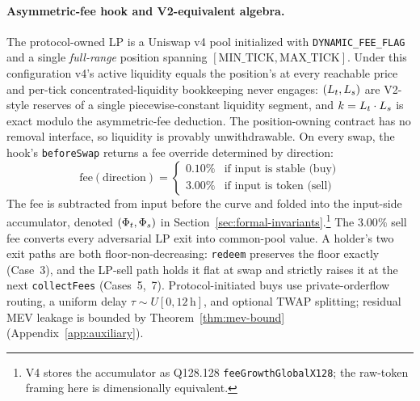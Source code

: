 \paragraph{Asymmetric-fee hook and V2-equivalent algebra.} The protocol-owned LP is a Uniswap v4 pool initialized with \texttt{DYNAMIC\_FEE\_FLAG} and a single \emph{full-range} position spanning $[\text{MIN\_TICK}, \text{MAX\_TICK}]$. Under this configuration v4's active liquidity equals the position's at every reachable price and per-tick concentrated-liquidity bookkeeping never engages: $(L_t, L_s)$ are V2-style reserves of a single piecewise-constant liquidity segment, and $k = L_t \cdot L_s$ is exact modulo the asymmetric-fee deduction. The position-owning contract has no removal interface, so liquidity is provably unwithdrawable. On every swap, the hook's \texttt{beforeSwap} returns a fee override determined by direction:
\begin{equation}
\text{fee}(\text{direction}) =
\begin{cases}
0.10\% & \text{if input is stable (buy)} \\
3.00\% & \text{if input is token (sell)}
\end{cases}
\label{eq:fee-asymmetry}
\end{equation}
The fee is subtracted from input before the curve and folded into the input-side accumulator, denoted $(\Phi_t, \Phi_s)$ in Section~\ref{sec:formal-invariants}.\footnote{V4 stores the accumulator as Q128.128 \texttt{feeGrowthGlobalX128}; the raw-token framing here is dimensionally equivalent.} The $3.00\%$ sell fee converts every adversarial LP exit into common-pool value. A holder's two exit paths are both floor-non-decreasing: \texttt{redeem} preserves the floor exactly (Case~3), and the LP-sell path holds it flat at swap and strictly raises it at the next \texttt{collectFees} (Cases~5,~7). Protocol-initiated buys use private-orderflow routing, a uniform delay $\tau \sim U[0, 12\,\text{h}]$, and optional TWAP splitting; residual MEV leakage is bounded by Theorem~\ref{thm:mev-bound} (Appendix~\ref{app:auxiliary}).

